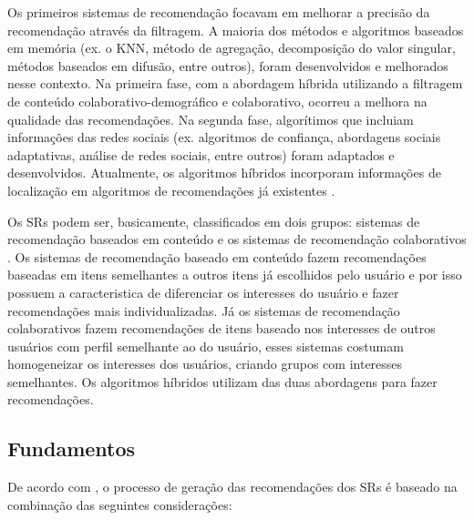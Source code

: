 Os primeiros sistemas de recomendação focavam em melhorar a precisão da 
recomendação através da filtragem. A maioria dos métodos e algoritmos 
baseados em memória (ex. o KNN, método de agregação, decomposição do valor 
singular, métodos baseados em difusão, entre outros), foram
desenvolvidos e melhorados nesse contexto. Na primeira fase, com a 
abordagem híbrida utilizando a filtragem de conteúdo 
colaborativo-demográfico e colaborativo, ocorreu a melhora na qualidade 
das recomendações. Na segunda fase, algorítimos que incluiam informações 
das redes sociais (ex. algoritmos de
confiança, abordagens sociais adaptativas, análise de redes sociais, 
entre outros) foram adaptados e 
desenvolvidos. Atualmente, os algoritmos híbridos incorporam informações 
de localização em algoritmos de recomendações já existentes \cite{bobadilla2013}. 

Os SRs podem ser, basicamente, classificados em dois grupos: sistemas de recomendação baseados	
em conteúdo e os sistemas de recomendação colaborativos \cite{mauricio}. Os sistemas
de recomendação baseado em conteúdo fazem recomendações baseadas em itens semelhantes
a outros itens já escolhidos pelo usuário e por isso possuem a caracteristica de
diferenciar os interesses do usuário e fazer recomendações mais individualizadas. Já os 
sistemas de recomendação colaborativos fazem recomendações de itens baseado nos interesses 
de outros usuários com perfil semelhante ao do usuário, esses sistemas costumam homogeneizar
os interesses dos usuários, criando grupos com interesses semelhantes. Os algoritmos híbridos 
utilizam das duas abordagens para fazer recomendações.




\subsection{Fundamentos}

De acordo com , o processo de geração das recomendações dos SRs é baseado 
na combinação das seguintes considerações:



